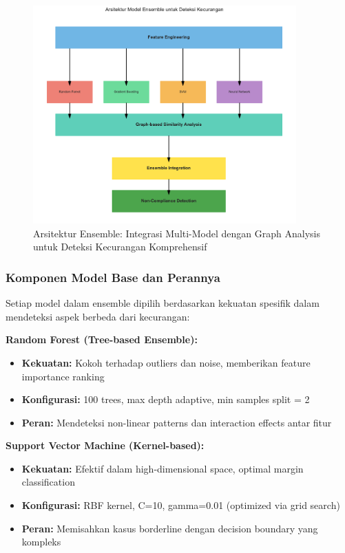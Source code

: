 \begin{figure}[htbp]
    \centering
    \includegraphics[width=0.9\textwidth]{figures/ensemble_architecture.pdf}
    \caption{Arsitektur Ensemble: Integrasi Multi-Model dengan Graph Analysis untuk Deteksi Kecurangan Komprehensif}
    \label{fig:ensemble_architecture_detail}
\end{figure}

\subsubsection{Komponen Model Base dan Perannya}
\label{sec:komponenModelBase}

Setiap model dalam ensemble dipilih berdasarkan kekuatan spesifik dalam mendeteksi aspek berbeda dari kecurangan:

\textbf{Random Forest (Tree-based Ensemble):}
\begin{itemize}
    \item \textbf{Kekuatan:} Kokoh terhadap outliers dan noise, memberikan feature importance ranking
    \item \textbf{Konfigurasi:} 100 trees, max depth adaptive, min samples split = 2
    \item \textbf{Peran:} Mendeteksi non-linear patterns dan interaction effects antar fitur
\end{itemize}

\textbf{Support Vector Machine (Kernel-based):}
\begin{itemize}
    \item \textbf{Kekuatan:} Efektif dalam high-dimensional space, optimal margin classification
    \item \textbf{Konfigurasi:} RBF kernel, C=10, gamma=0.01 (optimized via grid search)
    \item \textbf{Peran:} Memisahkan kasus borderline dengan decision boundary yang kompleks
\end{itemize}

